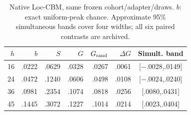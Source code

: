 \begin{table}[t]\centering\small
\caption{Native Loc-CBM, same frozen cohort/adapter/draws. $b$: exact uniform-peak chance. Approximate 95\% simultaneous bands cover four widths; all six paired contrasts are archived.}\label{tab:width}
\setlength{\tabcolsep}{3pt}
\begin{tabular}{rrrrrrc}\toprule
$h$ & $b$ & $S$ & $G$ & $G_{\rm rand}$ & $\Delta G$ & Simult. band\\\midrule
16 & .0222 & .0629 & .0328 & .0267 & .0061 & [$-.0028$,.0149]\\
24 & .0472 & .1240 & .0606 & .0498 & .0108 & [$-.0024$,.0240]\\
36 & .0981 & .2354 & .1074 & .0818 & .0256 & [.0080,.0431]\\
45 & .1445 & .3072 & .1227 & .1014 & .0214 & [.0023,.0404]\\
\bottomrule\end{tabular}\end{table}
